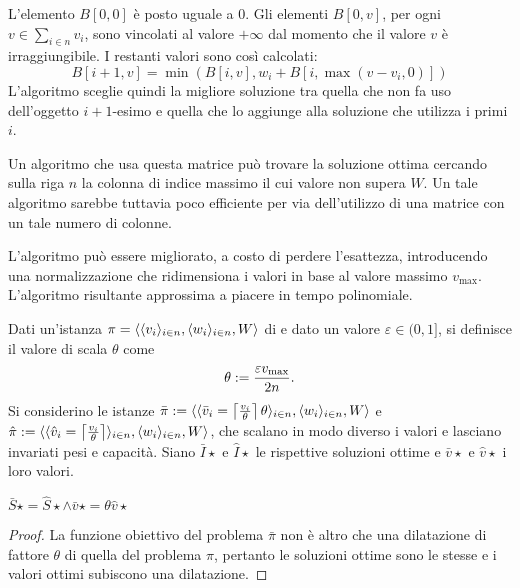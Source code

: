 L'elemento $B[0,0]$ è posto uguale a $0$. Gli elementi $B[0,v]$, per ogni $v\in\sum_{i\in n} v_i$, sono vincolati al valore $+\infty$ dal momento che il valore $v$ è irraggiungibile. I restanti valori sono così calcolati:
\begin{equation*}
	B[i+1,v] = \min(B[i,v], w_i+B[i,\max(v-v_i,0)])
\end{equation*}
L'algoritmo sceglie quindi la migliore soluzione tra quella che non fa uso dell'oggetto $i+1$-esimo e quella che lo aggiunge alla soluzione che utilizza i primi $i$.

Un algoritmo che usa questa matrice può trovare la soluzione ottima cercando sulla riga $n$ la colonna di indice massimo il cui valore non supera $W$. Un tale algoritmo sarebbe tuttavia poco efficiente per via dell'utilizzo di una matrice con un tale numero di colonne.

L'algoritmo può essere migliorato, a costo di perdere l'esattezza, introducendo una normalizzazione che ridimensiona i valori in base al valore massimo $v_{\max}$.
L'algoritmo risultante approssima a piacere in tempo polinomiale.

Dati un'istanza $\pi=\langle \langle v_i \rangle_{i\in n},\langle w_i \rangle_{i\in n},W \rangle$ di \Knapsack e dato un valore $\varepsilon\in(0,1]$, si definisce il valore di scala $\theta$ come
\begin{equation*}
	\theta:=\frac{\varepsilon v_{\max}}{2n} \text.
\end{equation*}
Si considerino le istanze $\bar\pi:=\langle \langle \bar v_i=\left\lceil \frac{v_i}{\theta} \right\rceil\theta \rangle_{i\in n},\langle w_i \rangle_{i\in n},W \rangle$ e $\hat\pi:=\langle \langle \hat v_i=\left\lceil \frac{v_i}{\theta} \right\rceil \rangle_{i\in n},\langle w_i \rangle_{i\in n},W \rangle$, che scalano in modo diverso i valori e lasciano invariati pesi e capacità.
Siano $\bar I\star$ e $\hat I\star$ le rispettive soluzioni ottime e $\bar v\star$ e $\hat v\star$ i loro valori.

\begin{lemma}\label{lem:knap_barhat}
	$\bar S\star = \hat S\star \land \bar v\star = \theta\hat v\star$
\end{lemma}
\begin{proof}
	La funzione obiettivo del problema $\bar\pi$ non è altro che una dilatazione di fattore $\theta$ di quella del problema $\hat\pi$, pertanto le soluzioni ottime sono le stesse e i valori ottimi subiscono una dilatazione.
\end{proof}

